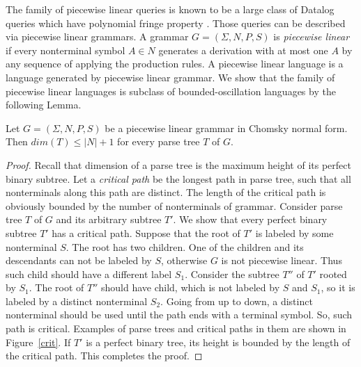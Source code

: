 \begin{example}
The family of piecewise linear queries is known to be a large class of Datalog queries which have polynomial fringe property \cite{Ullman}. Those queries can be described via piecewise linear grammars. A grammar $G = (\Sigma, N, P, S)$ is \textit{piecewise linear} if every nonterminal symbol $A \in N$ generates a derivation with at most one $A$ by any sequence of applying the production rules. A piecewise linear language is a language generated by piecewise linear grammar. We show that the family of piecewise linear languages is subclass of bounded-oscillation languages by the following Lemma.
\begin{lemma}
Let  $G = (\Sigma, N, P, S)$ be a piecewise linear grammar in Chomsky normal form. Then $dim(T) \le |N| + 1$ for every parse tree $T$ of $G$.
\end{lemma}
\begin{proof} Recall that dimension of a parse tree is the maximum height of its perfect binary subtree. Let a \textit{critical path} be the longest path in parse tree, such that all nonterminals along this path are distinct. The length of the critical path is obviously bounded by the number of nonterminals of grammar.  Consider parse tree $T$ of $G$ and its arbitrary subtree $T'$. We show that every perfect binary subtree $T'$ has a critical path. Suppose that the root of $T'$ is labeled by some nonterminal $S$. The root has two children. One of the children and its descendants can not be labeled by $S$, otherwise $G$ is not piecewise linear. Thus such child should have a different label $S_1$. Consider the subtree $T''$ of $T'$ rooted by $S_1$. The root of $T''$ should have child, which is not labeled by $S$ and $S_1$, so it is labeled by a distinct nonterminal $S_2$. Going from up to down, a distinct nonterminal should be used until the path ends with a terminal symbol. So, such path is critical. Examples of parse trees and critical paths in them are shown in Figure~\ref{crit}. If $T'$ is a perfect binary tree, its height is bounded by the length of the critical path. This completes the proof.
\end{proof}


\end{example}

